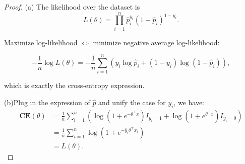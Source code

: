 \documentclass[en,hazy,blue,12pt,normal]{elegantnote}
\begin{document}
\begin{proof}
(a)
The likelihood over the dataset is
    \[L(\theta)=\prod_{i=1}^n \hat{p}_i^{y_i}\left(1-\hat{p}_i\right)^{1-y_i}.\]

    Maximize log-likelihood $\Leftrightarrow$ minimize negative average log-likelihood:

$$
-\frac{1}{n} \log L(\theta)=-\frac{1}{n} \sum_{i=1}^n\left(y_i \log \hat{p}_i+\left(1-y_i\right) \log \left(1-\hat{p}_i\right)\right),
$$

which is exactly the cross-entropy expression.

(b)Plug in the expression of $\hat{p}$ and unify the case for $y_i$, we have:
\begin{align}
    \textbf{CE}(\theta)&=\frac{1}{n}\sum_{i=1}^n(\log(1+e^{-\theta^\top x})I_{y_i = 1} + \log(1+e^{\theta^\top x})I_{y_i = 0})\\
    &=\frac{1}{n}\sum_{i=1}^n  \log \left(1+e^{-\bar{y}_i \theta^{\top} x_i}\right)\\
    &= L(\theta).
\end{align}
\end{proof}
\end{document}
